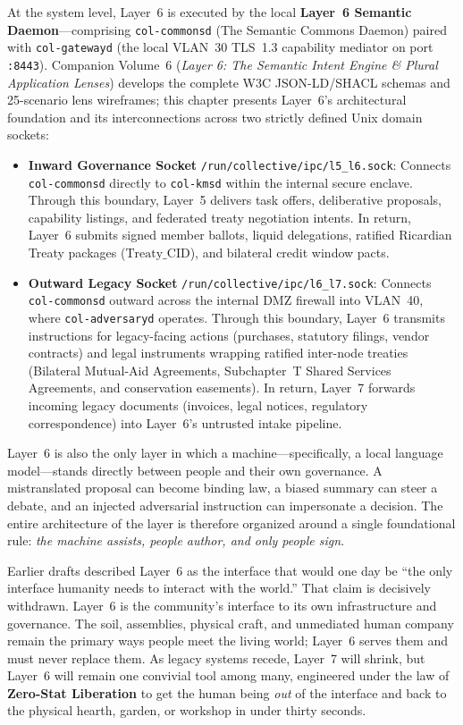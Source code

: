At the system level, Layer~6 is executed by the local \textbf{Layer~6 Semantic Daemon}---comprising \texttt{col-commonsd} (The Semantic Commons Daemon) paired with \texttt{col-gatewayd} (the local VLAN~30 TLS~1.3 capability mediator on port \texttt{:8443}). Companion Volume~6 (\textit{Layer 6: The Semantic Intent Engine \& Plural Application Lenses}) develops the complete W3C JSON-LD/SHACL schemas and 25-scenario lens wireframes; this chapter presents Layer~6's architectural foundation and its interconnections across two strictly defined Unix domain sockets:
\begin{itemize}
  \item \textbf{Inward Governance Socket}\newline
  \texttt{/run/collective/ipc/l5\_l6.sock}: Connects \texttt{col-commonsd} directly to \texttt{col-kmsd} within the internal secure enclave. Through this boundary, Layer~5 delivers task offers, deliberative proposals, capability listings, and federated treaty negotiation intents. In return, Layer~6 submits signed member ballots, liquid delegations, ratified Ricardian Treaty packages ($\mathrm{Treaty\_CID}$), and bilateral credit window pacts.
  \item \textbf{Outward Legacy Socket}\newline
  \texttt{/run/collective/ipc/l6\_l7.sock}: Connects \texttt{col-commonsd} outward across the internal DMZ firewall into VLAN~40, where \texttt{col-adversaryd} operates. Through this boundary, Layer~6 transmits instructions for legacy-facing actions (purchases, statutory filings, vendor contracts) and legal instruments wrapping ratified inter-node treaties (Bilateral Mutual-Aid Agreements, Subchapter~T Shared Services Agreements, and conservation easements). In return, Layer~7 forwards incoming legacy documents (invoices, legal notices, regulatory correspondence) into Layer~6's untrusted intake pipeline.
\end{itemize}

Layer~6 is also the only layer in which a machine---specifically, a local language model---stands directly between people and their own governance. A mistranslated proposal can become binding law, a biased summary can steer a debate, and an injected adversarial instruction can impersonate a decision. The entire architecture of the layer is therefore organized around a single foundational rule: \textit{the machine assists, people author, and only people sign}.

Earlier drafts described Layer~6 as the interface that would one day be ``the only interface humanity needs to interact with the world.'' That claim is decisively withdrawn. Layer~6 is the community's interface to its own infrastructure and governance. The soil, assemblies, physical craft, and unmediated human company remain the primary ways people meet the living world; Layer~6 serves them and must never replace them. As legacy systems recede, Layer~7 will shrink, but Layer~6 will remain one convivial tool among many, engineered under the law of \textbf{Zero-Stat Liberation} to get the human being \textit{out} of the interface and back to the physical hearth, garden, or workshop in under thirty seconds.

